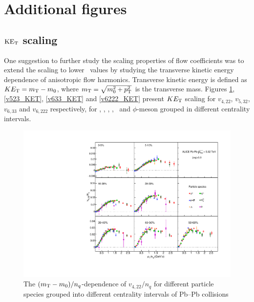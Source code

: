 \section{Additional figures}

\subsection{$\rm{KE_{T}}$ scaling}
\label{Subsubsection:KETscaling}

One suggestion to further study the scaling properties of flow coefficients was to extend the scaling to lower \pT~values by studying the transverse kinetic energy dependence of anisotropic flow harmonics. Transverse kinetic energy is defined as $KE_{\rm{T}} = m_{\rm{T}} - m_{\rm{0}}$, where $m_{\rm{T}}= \sqrt{m_{0}^2 + p_{\rm{T}}^2}$ is the transverse mass. Figures \ref{v422_KET}, \ref{v523_KET}, \ref{v633_KET} and \ref{v6222_KET} present $KE_{\rm{T}}$ scaling for $v_{4,22}$, $v_{5,32}$, $v_{6,33}$ and $v_{6,222}$ respectively, for \pion, \kaon, \proton, \Ks, \lambdas~and $\phi$-meson grouped in different centrality intervals.

\begin{figure}[htb]
\begin{center}
\includegraphics[scale=0.82]{figures/scaling/All_v422_gap00_KET_3by3.pdf}

\end{center}
\caption{The $(m_{\rm{T}} - m_{0})/n_{q}$-dependence of $v_{4,22}/n_{q}$ for different particle species grouped into different centrality intervals of Pb--Pb collisions \sNN}
\label{v422_KET}
\end{figure}

